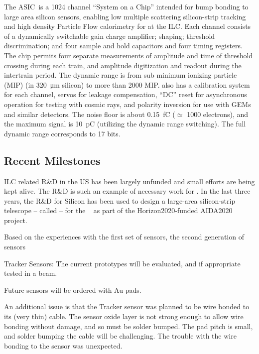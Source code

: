 The \KPIX ASIC~\cite{6551433}is a 1024 channel ``System on a Chip'' intended for bump bonding 
to large area silicon sensors, enabling low multiple scattering silicon-strip 
tracking and high density Particle Flow calorimetry for \SID at the ILC. 
Each channel consists of a dynamically switchable gain charge amplifier; 
shaping; threshold discrimination; and four sample and hold 
capacitors and four timing registers. The chip permits four  separate measurements of 
amplitude and time of threshold crossing during each train, and amplitude 
digitization and readout during the intertrain period. The dynamic range is from 
sub minimum ionizing particle (MIP) (in \SI{320}{\micro\meter} silicon) to more 
than 2000 MIP. \KPIX also has a calibration system for each channel, servos for 
leakage compensation, ``DC'' reset for asynchronous operation for testing with 
cosmic rays, and polarity inversion for use with GEMs and similar detectors. The 
noise floor is about \SI{0.15}{fC} ($\simeq$ 1000 electrons), and the maximum 
signal is \SI{10}{pC} (utilizing the dynamic range switching). The full dynamic 
range corresponds to 17 bits.


\subsection{Recent Milestones}
ILC related R\&D in the US has been largely unfunded and small efforts are being kept alive. The \KPIX R\&D is such an example of necessary work for \SID.
In the last three years, the R\&D for \KPIX Silicon has been used to design a large-area silicon-strip telescope -- called \LYCORIS -- for the \DIITBF~\cite{desytb2018}
as part of the Horizon2020-funded AIDA2020~\cite{aida2020} project.

Based on the experiences with the first set of sensors, the second generation of sensors

Tracker Sensors: The current prototypes will be evaluated, and if appropriate tested in a beam.

Future sensors will be ordered with Au pads.

An additional issue is that the Tracker sensor was planned to be wire bonded to its (very thin) cable. The sensor oxide layer is not strong enough to allow wire bonding without damage, and so must be solder bumped. The pad pitch is small, and solder bumping the cable will be challenging. The trouble with the wire bonding to the sensor was unexpected.

